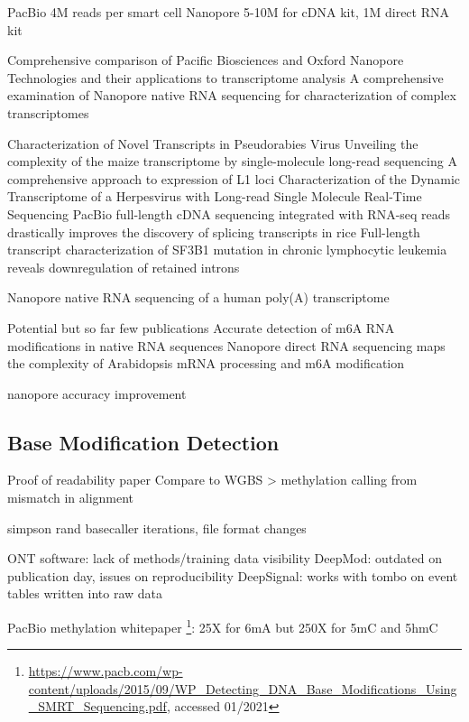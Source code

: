 PacBio 4M reads per smart cell
Nanopore 5-10M for cDNA kit, 1M direct RNA kit

Comprehensive comparison of Pacific Biosciences and Oxford Nanopore Technologies and their applications to transcriptome analysis \cite{Weirather2017}
A comprehensive examination of Nanopore native RNA sequencing for characterization of complex transcriptomes \cite{Soneson2019}

Characterization of Novel Transcripts in Pseudorabies Virus \cite{Tombacz2015}
Unveiling the complexity of the maize transcriptome by single-molecule long-read sequencing \cite{Wang2016}
A comprehensive approach to expression of L1 loci \cite{Deininger2017}
Characterization of the Dynamic Transcriptome of a Herpesvirus with Long-read Single Molecule Real-Time Sequencing \cite{Tombacz2017}
PacBio full-length cDNA sequencing integrated with RNA-seq reads drastically improves the discovery of splicing transcripts in rice \cite{Zhang2019a}
Full-length transcript characterization of SF3B1 mutation in chronic lymphocytic leukemia reveals downregulation of retained introns \cite{Tang2020}

Nanopore native RNA sequencing of a human poly(A) transcriptome \cite{Workman2019}

Potential but so far few publications
Accurate detection of m6A RNA modifications in native RNA sequences \cite{Liu2019}
Nanopore direct RNA sequencing maps the complexity of Arabidopsis mRNA processing and m6A modification \cite{Parker2020}

nanopore accuracy improvement




\subsection{Base Modification Detection}
\label{subsec:state_of_art:basemod}

Proof of readability paper \cite{Schreiber2013}
Compare to WGBS > methylation calling from mismatch in alignment

simpson \cite{Simpson2017}
rand \cite{Rand2017}
basecaller iterations, file format changes

ONT software: lack of methods/training data visibility
DeepMod: outdated on publication day, issues on reproducibility
DeepSignal: works with tombo on event tables written into raw data

PacBio methylation whitepaper \footnote{\url{https://www.pacb.com/wp-content/uploads/2015/09/WP_Detecting_DNA_Base_Modifications_Using_SMRT_Sequencing.pdf}, accessed 01/2021}:
25X for 6mA but 250X for 5mC and 5hmC

